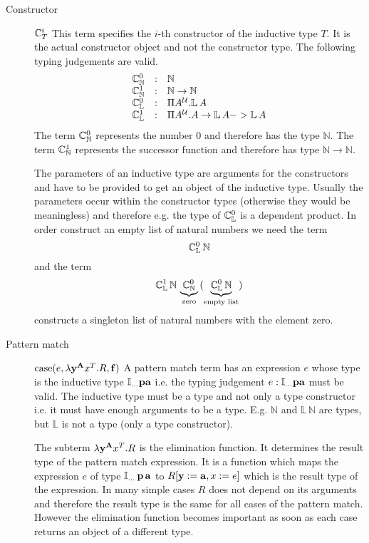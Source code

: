 \begin{description}
\item[Constructor] $\mathbb{C}^i_T$ This term specifies the $i$-th
  constructor of the inductive type $T$. It is the actual constructor object
  and not the constructor type. The following typing judgements are valid.
  $$
  \begin{array}{lll}
    \mathbb{C}^0_\mathbb{N}
    &:& \mathbb{N}
    \\
    \mathbb{C}^1_\mathbb{N}
    &:& \mathbb{N} \to \mathbb{N}
    \\
    \mathbb{C}^0_\mathbb{L}
    &:& \Pi A^{\cal{U}}. \mathbb{L} \, A
    \\
    \mathbb{C}^1_\mathbb{L}
    &:& \Pi A^{\cal{U}}. A \to \mathbb{L}\, A -> \mathbb{L}\,A
  \end{array}
  $$
  The term $\mathbb{C}^0_{\mathbb{N}}$ represents the number $0$ and
  therefore has the type $\mathbb{N}$. The term $\mathbb{C}^1_{\mathbb{N}}$
  represents the successor function and therefore has type
  $\mathbb{N}\to\mathbb{N}$.

  The parameters of an inductive type are arguments for the constructors and
  have to be provided to get an object of the inductive type. Usually the
  parameters occur within the constructor types (otherwise they would be
  meaningless) and therefore e.g. the type of $\mathbb{C}^0_{\mathbb{L}}$ is
  a dependent product. In order construct an empty list of natural numbers we
  need the term
  $$
  \mathbb{C}^0_{\mathbb{L}} \, \mathbb{N}
  $$
  and the term
  $$
  \mathbb{C}^1_{\mathbb{L}}
  \,
  \mathbb{N}
  \,
  \underbrace{\mathbb{C}^0_{\mathbb{N}}}_{\text{zero}}
  \,
  (\underbrace{\mathbb{C}^0_{\mathbb{L}} \, \mathbb{N}}_{\text{empty list}})
  $$
  constructs a singleton list of natural numbers with the element zero.


\item[Pattern match] $\text{case}(e,\lambda \mathbf{y}^{\mathbf{A}} x^T.R, \mathbf{f})$ A pattern
  match term has an expression $e$ whose type is the inductive type
  $\mathbb{I}_{\ldots} \mathbf{p} \mathbf{a}$ i.e. the typing judgement
  $e : \mathbb{I}_{\ldots} \mathbf{p} \mathbf{a}$ must be valid. The inductive type
  must be a type and not only a type constructor i.e. it must have enough
  arguments to be a type. E.g. $\mathbb{N}$ and
  $\mathbb{L}\, \mathbb{N}$ are types, but $\mathbb{L}$ is not a type (only a
  type constructor).

  The subterm $\lambda \mathbf{y}^{\mathbf{A}} x^T.R$ is the elimination function. It
  determines the result type of the pattern match expression. It is a function
  which maps the expression $e$ of type
  $\mathbb{I}_{\ldots} \, \mathbf{p} \, \mathbf{a}$ to $R[\mathbf{y} := \mathbf{a}, x:=e]$
  which is the result type of the expression. In many simple cases $R$ does
  not depend on its arguments and therefore the result type is the same for
  all cases of the pattern match. However the elimination function becomes
  important as soon as each case returns an object of a different type.


\end{description}
